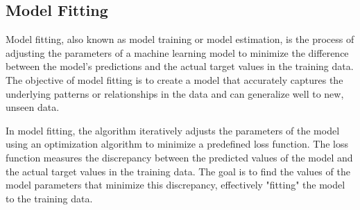 \documentclass[a4paper]{article}
\begin{document}
\subsection*{Model Fitting}
Model fitting, also known as model training or model estimation, is the process of adjusting the parameters of a machine learning model to minimize the difference between the model's predictions and the actual target values in the training data. The objective of model fitting is to create a model that accurately captures the underlying patterns or relationships in the data and can generalize well to new, unseen data.

In model fitting, the algorithm iteratively adjusts the parameters of the model using an optimization algorithm to minimize a predefined loss function. The loss function measures the discrepancy between the predicted values of the model and the actual target values in the training data. The goal is to find the values of the model parameters that minimize this discrepancy, effectively "fitting" the model to the training data.
\end{document}
